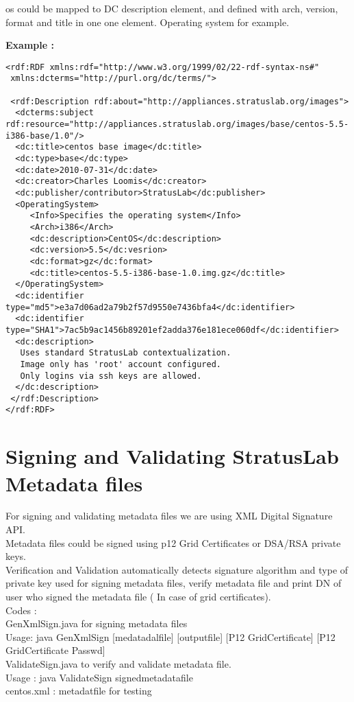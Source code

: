 \documentclass{../stylesheet/stratuslab}
\begin{document}
os could be mapped to  DC description element, and defined with  arch, version, format and title in one one element. Operating system for example. 

\newpage

{\bf Example :} 
\begin{verbatim}
<rdf:RDF xmlns:rdf="http://www.w3.org/1999/02/22-rdf-syntax-ns#"
 xmlns:dcterms="http://purl.org/dc/terms/">

 <rdf:Description rdf:about="http://appliances.stratuslab.org/images">
  <dcterms:subject rdf:resource="http://appliances.stratuslab.org/images/base/centos-5.5-i386-base/1.0"/>
  <dc:title>centos base image</dc:title>
  <dc:type>base</dc:type>
  <dc:date>2010-07-31</dc:date>
  <dc:creator>Charles Loomis</dc:creator>
  <dc:publisher/contributor>StratusLab</dc:publisher>
  <OperatingSystem>
     <Info>Specifies the operating system</Info>
     <Arch>i386</Arch>
     <dc:description>CentOS</dc:description>
     <dc:version>5.5</dc:vesrion>
     <dc:format>gz</dc:format>
     <dc:title>centos-5.5-i386-base-1.0.img.gz</dc:title>
  </OperatingSystem>
  <dc:identifier type="md5">e3a7d06ad2a79b2f57d9550e7436bfa4</dc:identifier>
  <dc:identifier type="SHA1">7ac5b9ac1456b89201ef2adda376e181ece060df</dc:identifier>
  <dc:description>
   Uses standard StratusLab contextualization.
   Image only has 'root' account configured.
   Only logins via ssh keys are allowed.
  </dc:description>
 </rdf:Description>
</rdf:RDF>
\end{verbatim}

\section{Signing and Validating StratusLab Metadata files}
For signing and validating metadata files we are using XML Digital Signature API. \\
Metadata files could be signed using p12 Grid Certificates or DSA/RSA private keys. \\
Verification and Validation automatically detects signature algorithm and type of private key used for signing metadata files, verify metadata file and print DN of user who signed the metadata file ( In case of grid certificates). \\

Codes : \\
GenXmlSign.java for signing metadata files \\

Usage: java GenXmlSign [medatadalfile] [outputfile] [P12 GridCertificate] [P12 GridCertificate Passwd] \\

ValidateSign.java to verify and validate metadata file. \\

Usage : java ValidateSign signedmetadatafile \\

centos.xml : metadatfile for testing
\end{document}
